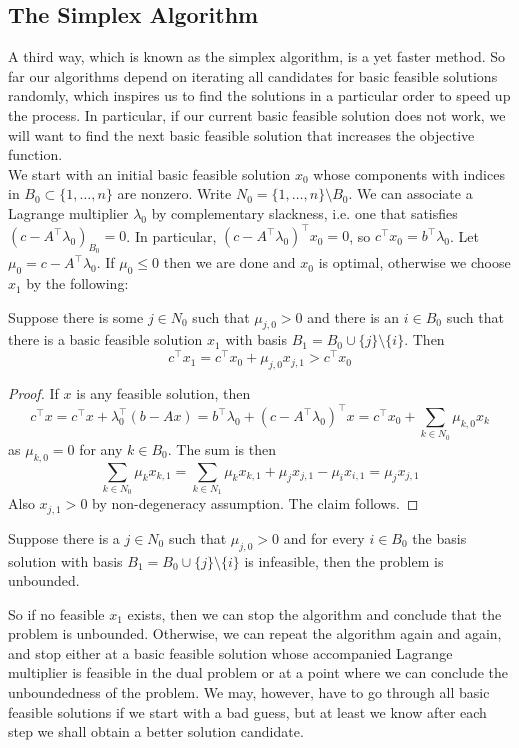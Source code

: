 \subsection{The Simplex Algorithm}
A third way, which is known as the simplex algorithm, is a yet faster method.
So far our algorithms depend on iterating all candidates for basic feasible solutions randomly, which inspires us to find the solutions in a particular order to speed up the process.
In particular, if our current basic feasible solution does not work, we will want to find the next basic feasible solution that increases the objective function.\\
We start with an initial basic feasible solution $x_0$ whose components with indices in $B_0\subset\{1,\ldots,n\}$ are nonzero.
Write $N_0=\{1,\ldots,n\}\setminus B_0$.
We can associate a Lagrange multiplier $\lambda_0$ by complementary slackness, i.e. one that satisfies $(c-A^\top\lambda_0)_{B_0}=0$.
In particular, $(c-A^\top\lambda_0)^\top x_0=0$, so $c^\top x_0=b^\top\lambda_0$.
Let $\mu_0=c-A^\top\lambda_0$.
If $\mu_0\le 0$ then we are done and $x_0$ is optimal, otherwise we choose $x_1$ by the following:
\begin{claim}
    Suppose there is some $j\in N_0$ such that $\mu_{j,0}>0$ and there is an $i\in B_0$ such that there is a basic feasible solution $x_1$ with basis $B_1=B_0\cup\{j\}\setminus\{i\}$.
    Then
    $$c^\top x_1=c^\top x_0+\mu_{j,0}x_{j,1}>c^\top x_0$$
\end{claim}
\begin{proof}
    If $x$ is any feasible solution, then
    $$c^\top x=c^\top x+\lambda_0^\top(b-Ax)=b^\top\lambda_0+(c-A^\top\lambda_0)^\top x=c^\top x_0+\sum_{k\in N_0}\mu_{k,0}x_k$$
    as $\mu_{k,0}=0$ for any $k\in B_0$.
    The sum is then
    $$\sum_{k\in N_0}\mu_k x_{k,1}=\sum_{k\in N_1}\mu_kx_{k,1}+\mu_jx_{j,1}-\mu_ix_{i,1}=\mu_jx_{j,1}$$
    Also $x_{j,1}>0$ by non-degeneracy assumption.
    The claim follows.
\end{proof}
\begin{proposition}\label{simplex_unbounded}
    Suppose there is a $j\in N_0$ such that $\mu_{j,0}>0$ and for every $i\in B_0$ the basis solution with basis $B_1=B_0\cup\{j\}\setminus\{i\}$ is infeasible, then the problem is unbounded.
\end{proposition}
So if no feasible $x_1$ exists, then we can stop the algorithm and conclude that the problem is unbounded.
Otherwise, we can repeat the algorithm again and again, and stop either at a basic feasible solution whose accompanied Lagrange multiplier is feasible in the dual problem or at a point where we can conclude the unboundedness of the problem.
We may, however, have to go through all basic feasible solutions if we start with a bad guess, but at least we know after each step we shall obtain a better solution candidate.
